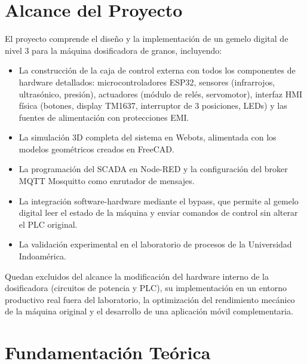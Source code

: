 \section{Alcance del Proyecto}
El proyecto comprende el diseño y la implementación de un gemelo digital de nivel 3 para la máquina dosificadora de granos, incluyendo:
\begin{itemize}
    \item La construcción de la caja de control externa con todos los componentes de hardware detallados: microcontroladores ESP32, sensores (infrarrojos, ultrasónico, presión), actuadores (módulo de relés, servomotor), interfaz HMI física (botones, display TM1637, interruptor de 3 posiciones, LEDs) y las fuentes de alimentación con protecciones EMI.
    \item La simulación 3D completa del sistema en Webots, alimentada con los modelos geométricos creados en FreeCAD.
    \item La programación del SCADA en Node-RED y la configuración del broker MQTT Mosquitto como enrutador de mensajes.
    \item La integración software-hardware mediante el bypass, que permite al gemelo digital leer el estado de la máquina y enviar comandos de control sin alterar el PLC original.
    \item La validación experimental en el laboratorio de procesos de la Universidad Indoamérica.
\end{itemize}
Quedan excluidos del alcance la modificación del hardware interno de la dosificadora (circuitos de potencia y PLC), su implementación en un entorno productivo real fuera del laboratorio, la optimización del rendimiento mecánico de la máquina original y el desarrollo de una aplicación móvil complementaria.

\section{Fundamentación Teórica}

